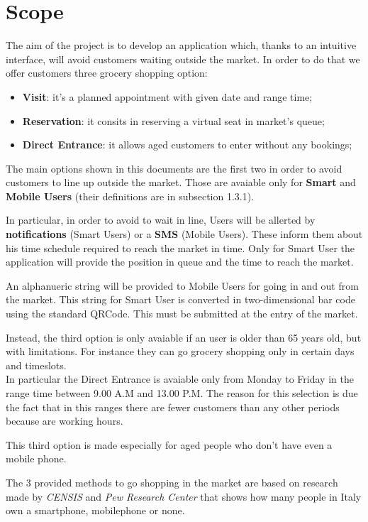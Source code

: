  
\section{Scope}

The aim of the project is to develop an application which, thanks to an intuitive interface, will avoid customers waiting outside the market.
In order to do that we offer customers three grocery shopping option: 

\begin{itemize}
\item \textbf{Visit}: it's a planned appointment with given date and range time;
\item \textbf{Reservation}: it consits in reserving a virtual seat in market's queue;
\item \textbf{Direct Entrance}: it allows aged customers to enter without any bookings;
\end{itemize}
\bigskip
The main options shown in this documents are the first two in order to avoid customers to line up outside the market. Those are avaiable only for \textbf{Smart} and \textbf{Mobile Users} (their definitions are in subsection 1.3.1).\par
In particular, in order to avoid to wait in line, Users will be allerted by \textbf{notifications} (Smart Users) or a \textbf{SMS} (Mobile Users). These inform them about his time schedule required to reach the market in time.
Only for Smart User the application will provide the position in queue and the time to reach the market.\par
An alphanueric string will be provided to Mobile Users for going in and out from the market. This string for Smart User is converted in two-dimensional bar code using the standard QRCode. This must be submitted at the entry of the market.\par
Instead, the third option is only avaiable if an user is older than 65 years old, but with limitations. For instance they can go grocery shopping only in certain days and timeslots. \\
In particular the Direct Entrance is avaiable only from Monday to Friday in the range time between 9.00 A.M and 13.00 P.M. The reason for this selection is due the fact that in this ranges there are fewer customers than any other periods because are working hours. \par
This third option is made especially for aged people who don't have even a mobile phone. \par
The 3 provided methods to go shopping in the market are based on research made by \textit{CENSIS} and \textit{Pew Research Center} that shows how many people in Italy own a smartphone, mobilephone or none.\\
